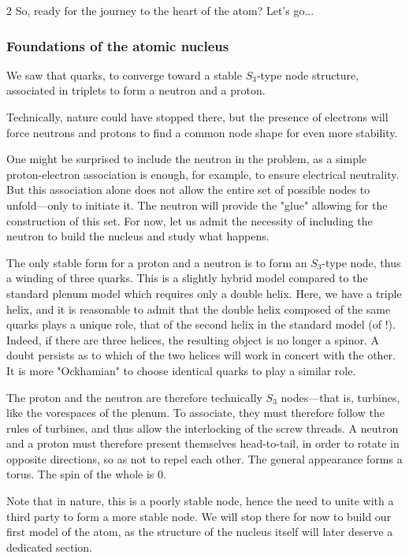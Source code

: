 \begin{multicols}{2}
	So, ready for the journey to the heart of the atom? Let's go...
	
	\subsubsection{Foundations of the atomic nucleus}
	
	We saw that quarks, to converge toward a stable $S_3$-type node structure, associated in triplets to form a neutron and a proton.
	
	Technically, nature could have stopped there, but the presence of electrons will force neutrons and protons to find a common node shape for even more stability.
	
	One might be surprised to include the neutron in the problem, as a simple proton-electron association is enough, for example, to ensure electrical neutrality. But this association alone does not allow the entire set of possible nodes to unfold—only to initiate it. The neutron will provide the "glue" allowing for the construction of this set. For now, let us admit the necessity of including the neutron to build the nucleus and study what happens.
	
	The only stable form for a proton and a neutron is to form an $S_3$-type node, thus a winding of three quarks. This is a slightly hybrid model compared to the standard plenum model which requires only a double helix. Here, we have a triple helix, and it is reasonable to admit that the double helix composed of the same quarks plays a unique role, that of the second helix in the standard model (of \PQ!). Indeed, if there are three helices, the resulting object is no longer a spinor. A doubt persists as to which of the two helices will work in concert with the other. It is more "Ockhamian" to choose identical quarks to play a similar role.
	
	The proton and the neutron are therefore technically $S_3$ nodes—that is, turbines, like the vorespaces of the plenum. To associate, they must therefore follow the rules of turbines, and thus allow the interlocking of the screw threads. A neutron and a proton must therefore present themselves head-to-tail, in order to rotate in opposite directions, so as not to repel each other. The general appearance forms a torus. The spin of the whole is 0.
	
	Note that in nature, this is a poorly stable node, hence the need to unite with a third party to form a more stable node. We will stop there for now to build our first model of the atom, as the structure of the nucleus itself will later deserve a dedicated section.
	

\end{multicols}
